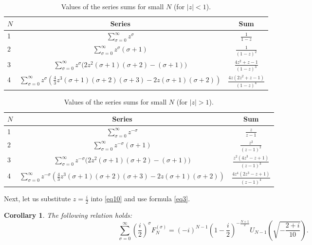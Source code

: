 \documentclass{article}
\newtheorem{cor}[thm]{Corollary}
\renewcommand{\arraystretch}{1.5}
\begin{document}
\begin{table}
\begin{center}
\renewcommand{\arraystretch}{1.5}
\begin{tabular}{|l|c|c|}
\hline
$N$ & Series & Sum \\ \hline
1 & $\sum_{\sigma = 0}^{\infty} z^\sigma$ & $\frac{1}{1 - z}$ \\ \hline
2 & $\sum_{\sigma = 0}^{\infty} z^\sigma(\sigma + 1)$ & $\frac{1}{(1 - z)^2}$ \\ \hline
3 & $\sum_{\sigma = 0}^{\infty} z^\sigma\big(2z^2(\sigma + 1)(\sigma + 2) - (\sigma + 1)\big)$ & $\frac{4z^2 + z - 1}{(1 - z)^3}$ \\ \hline
4 & $\sum_{\sigma = 0}^{\infty} z^\sigma\left(\frac{4}{3}z^3(\sigma + 1)(\sigma + 2)(\sigma + 3) - 2z(\sigma + 1)(\sigma + 2)\right)$ & $\frac{4z(2z^2 + z - 1)}{(1 - z)^4}$ \\ \hline
\end{tabular}
\end{center}
\caption{Values of the series sums for small $N$ (for $|z| < 1$).}\label{tab1}
\end{table}

\begin{table}
\begin{center}
\renewcommand{\arraystretch}{1.5}
\begin{tabular}{|l|c|c|}
\hline
$N$ & Series & Sum \\ \hline
1 & $\sum_{\sigma = 0}^{\infty} z^{-\sigma}$ & $\frac{z}{z - 1}$ \\ \hline
2 & $\sum_{\sigma = 0}^{\infty} z^{-\sigma}(\sigma + 1)$ & $\frac{z^2}{(z - 1)^2}$ \\ \hline
3 & $\sum_{\sigma = 0}^{\infty} z^{-\sigma}\big(2z^2(\sigma + 1)(\sigma + 2) - (\sigma + 1)\big)$ & $\frac{z^2(4z^3 - z + 1)}{(z - 1)^3}$ \\ \hline
4 & $\sum_{\sigma = 0}^{\infty} z^{-\sigma}\left(\frac{4}{3}z^3(\sigma + 1)(\sigma + 2)(\sigma + 3) - 2z(\sigma + 1)(\sigma + 2)\right)$ & $\frac{4z^4(2z^3 - z + 1)}{(z - 1)^4}$ \\ \hline
\end{tabular}
\end{center}
\caption{Values of the series sums for small $N$ (for $|z| > 1$).}\label{tab2}
\end{table}

Next, let us substitute $z = \frac{i}{2}$ into \eqref{eq10} and use formula \eqref{eq3}.

\begin{cor}\label{cor1}
The following relation holds:
$$
\sum_{\sigma = 0}^{\infty}\left(\frac{i}{2}\right)^\sigma F_N^{(\sigma)} = (-i)^{N - 1}\left(1 - \frac{i}{2}\right)^{-\frac{N + 1}{2}}U_{N-1}\left(\sqrt{-\frac{2 + i}{10}}\right).
$$
\end{cor}
\end{document}
